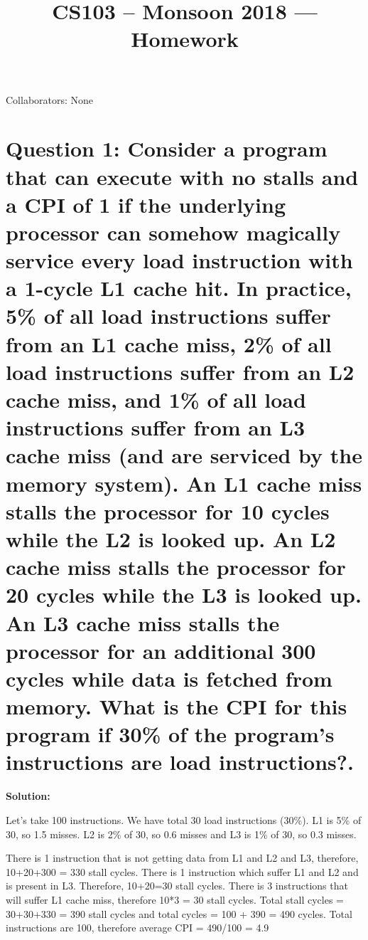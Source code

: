 \documentclass[11pt]{article}
\title{CS103 -- Monsoon 2018 --- Homework \Homework}
\author{\Name 
}
\date{}
\begin{document}
\maketitle

Collaborators: None
\section* {Question 1: Consider a program that can execute with no stalls and a CPI of 1 if the underlying processor can somehow magically service every load instruction with a 1-cycle L1 cache hit. In practice, 5\% of all load instructions suffer from an L1 cache miss, 2\% of all load instructions suffer from an L2 cache miss, and 1\% of all load instructions suffer from an L3 cache miss (and are serviced by the memory system). An L1 cache miss stalls the processor for 10 cycles while the L2 is looked up. An L2 cache miss stalls the processor for 20 cycles while the L3 is looked up. An L3 cache miss stalls the processor for an additional 300 cycles while data is fetched from memory. What is the CPI for this program if 30\% of the program's instructions are load instructions?.  }

\textbf{Solution: }

Let's take 100 instructions. We have total 30 load instructions (30\%). L1 is 5\% of 30, so 1.5 misses. L2 is 2\% of 30, so 0.6 misses and L3 is 1\% of 30, so 0.3 misses.

\newline 

There is 1 instruction that is not getting data from L1 and L2 and L3, therefore, 10+20+300 = 330 stall cycles. There is 1 instruction which suffer L1 and L2 and is present in L3. Therefore, 10+20=30 stall cycles. There is 3 instructions that will suffer L1 cache miss, therefore 10*3 = 30 stall cycles.
\newline 
Total stall cycles = 30+30+330 = 390 stall cycles and total cycles = 100 + 390 = 490 cycles.
\newline 
Total instructions are 100, therefore average CPI = 490/100 = 4.9


	
\end{document}
